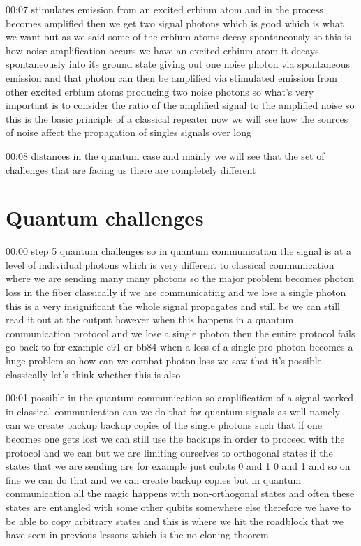 00:07
stimulates emission from an excited erbium atom
and in the process becomes amplified then we get
two signal photons which is good which is what we want
but as we said some of the erbium atoms decay spontaneously
so this is how noise amplification occurs
we have an excited erbium atom it decays spontaneously into its ground state
giving out one noise photon via spontaneous emission and that photon can
then be amplified via stimulated emission from other excited erbium atoms
producing two noise photons so what's very important
is to consider the ratio of the amplified signal to the amplified noise
so this is the basic principle of a classical repeater now we will see how
the sources of noise affect the propagation of singles signals over long

00:08
distances in the quantum case and mainly we will see that the set of
challenges that are facing us there are completely different

\section{Quantum challenges}


00:00
step 5 quantum challenges so in quantum communication the signal
is at a level of individual photons which is very different to
classical communication where we are sending many many photons
so the major problem becomes photon loss in the fiber
classically if we are communicating and we lose a single photon
this is a very insignificant the whole signal propagates and
still be we can still read it out at the output
however when this happens in a quantum communication protocol
and we lose a single photon then the entire protocol
fails go back to for example e91 or bb84 when a loss of a single pro
photon becomes a huge problem so how can we combat photon loss we saw
that it's possible classically let's think whether this is also

00:01
possible in the quantum communication so amplification of a signal worked in
classical communication can we do that for quantum signals as well
namely can we create backup backup copies of the single photons such that
if one becomes one gets lost we can still use the
backups in order to proceed with the protocol
and we can but we are limiting ourselves to orthogonal states
if the states that we are sending are for example just cubits
0 and 1 0 and 1 and so on fine we can do that and we can create backup copies
but in quantum communication all the magic happens with
non-orthogonal states and often these states are entangled with some other
qubits somewhere else therefore we have to be able to copy
arbitrary states and this is where we hit the roadblock that we have seen in
previous lessons which is the no cloning theorem

